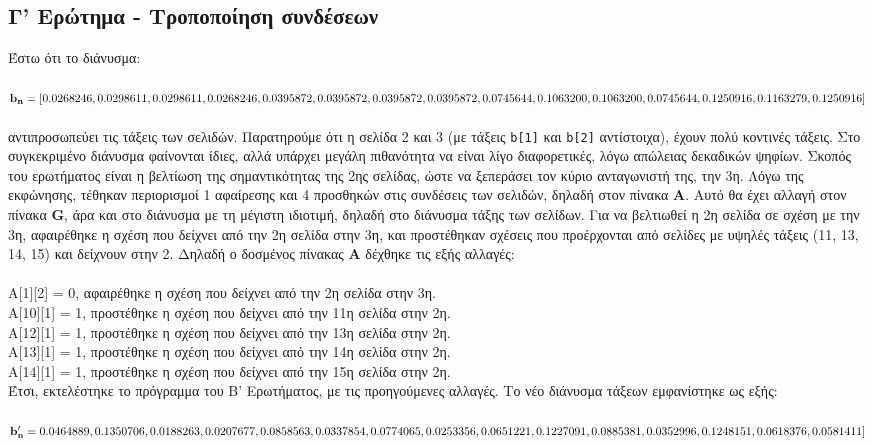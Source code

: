 \documentclass[a4paper, 14pt]{article}   %
\begin{document}
\subsection*{Γ' Ερώτημα - Τροποποίηση συνδέσεων}  %
Έστω ότι το διάνυσμα:\\\\
$\mathbf{b_n} = [0.0268246, 0.0298611, 0.0298611, 0.0268246, 0.0395872, 0.0395872, 0.0395872,\\ 0.0395872, 0.0745644, 0.1063200, 0.1063200, 0.0745644, 0.1250916, 0.1163279,  0.1250916]$\\\\ αντιπροσωπεύει τις τάξεις των σελιδών. Παρατηρούμε ότι η σελίδα 2 και 3 (με τάξεις \texttt{b[1]} και \texttt{b[2]} αντίστοιχα), έχουν πολύ κοντινές τάξεις. Στο συγκεκριμένο διάνυσμα φαίνονται ίδιες, αλλά υπάρχει μεγάλη πιθανότητα να είναι λίγο διαφορετικές, λόγω απώλειας δεκαδικών ψηφίων. Σκοπός του ερωτήματος είναι η βελτίωση της σημαντικότητας της 2ης σελίδας, ώστε να ξεπεράσει τον κύριο ανταγωνιστή της, την 3η. Λόγω της εκφώνησης, τέθηκαν περιορισμοί 1 αφαίρεσης και 4 προσθηκών στις συνδέσεις των σελιδών, δηλαδή στον πίνακα $\mathbf{Α}$. Αυτό θα έχει αλλαγή στον πίνακα $\mathbf{G}$, άρα και στο διάνυσμα με τη μέγιστη ιδιοτιμή, δηλαδή στο διάνυσμα τάξης των σελίδων. Για να βελτιωθεί η 2η σελίδα σε σχέση με την 3η, αφαιρέθηκε η σχέση που δείχνει από την 2η σελίδα στην 3η, και προστέθηκαν σχέσεις που προέρχονται από σελίδες με υψηλές τάξεις (11, 13, 14, 15) και δείχνουν στην 2. Δηλαδή ο δοσμένος πίνακας $\mathbf{Α}$ δέχθηκε τις εξής αλλαγές:\\\\
A[1][2] = 0, αφαιρέθηκε η σχέση που δείχνει από την 2η σελίδα στην 3η.\\
A[10][1] = 1, προστέθηκε η σχέση που δείχνει από την 11η σελίδα στην 2η.\\
A[12][1] = 1, προστέθηκε η σχέση που δείχνει από την 13η σελίδα στην 2η.\\
A[13][1] = 1, προστέθηκε η σχέση που δείχνει από την 14η σελίδα στην 2η.\\
A[14][1] = 1, προστέθηκε η σχέση που δείχνει από την 15η σελίδα στην 2η.\\
Έτσι, εκτελέστηκε το πρόγραμμα του Β' Ερωτήματος, με τις προηγούμενες αλλαγές. Το νέο διάνυσμα τάξεων εμφανίστηκε ως εξής:\\\\
$\mathbf{b'_n} = 0.0464889, 0.1350706, 0.0188263, 0.0207677, 0.0858563, 0.0337854, 0.0774065,\\ 0.0253356, 0.0651221, 0.1227091, 0.0885381, 0.0352996, 0.1248151, 0.0618376, 0.0581411]$\\\\
\end{document}
